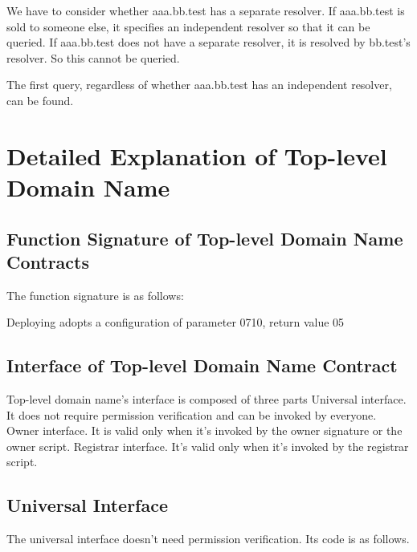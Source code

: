 \documentclass[letterpaper,10pt,english]{sphinxmanual}
\begin{document}
We have to consider whether aaa.bb.test has a separate resolver. If aaa.bb.test is sold to someone else,
it specifies an independent resolver so that it can be queried. If aaa.bb.test does not have a separate resolver, it is resolved by bb.test’s resolver.
So this cannot be queried.

The first query, regardless of whether aaa.bb.test has an independent resolver, can be found.


\section{Detailed Explanation of Top-level Domain Name}
\label{\detokenize{nns_protocol:detailed-explanation-of-top-level-domain-name}}

\subsection{Function Signature of Top-level Domain Name Contracts}
\label{\detokenize{nns_protocol:function-signature-of-top-level-domain-name-contracts}}
The function signature is as follows:

%
\begin{sphinxVerbatim}[commandchars=\\\{\}]
     \PYG{p}{[}\PYG{p}{]} 
\end{sphinxVerbatim}

Deploying adopts a configuration of parameter 0710, return value 05


\subsection{Interface of Top-level Domain Name Contract}
\label{\detokenize{nns_protocol:interface-of-top-level-domain-name-contract}}
Top-level domain name’s interface is composed of three parts
Universal interface. It does not require permission verification and can be invoked by everyone.
Owner interface. It is valid only when it’s invoked by the owner signature or the owner script.
Registrar interface. It’s valid only when it’s invoked by the registrar script.


\subsection{Universal Interface}
\label{\detokenize{nns_protocol:universal-interface}}
The universal interface doesn’t need permission verification. Its code is as follows.
\end{document}
